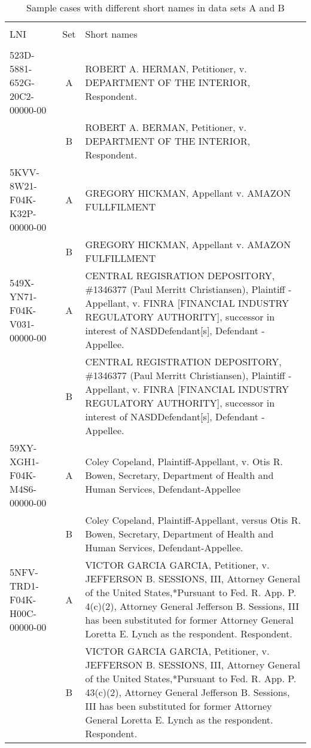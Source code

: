 \documentclass[10pt, letterpaper]{article}
\begin{document}
\begin{spacing}{1.0}
\begin{small}
\begin{longtable}[H]{lcp{4in}}
    \caption{Sample cases with different short names in data sets A and B}\\
    \hline\\[-6pt]
    LNI & Set & Short names\\[4pt]
    \hline\\[-6pt]
    \endhead
    523D-5881-652G-20C2-00000-00 & A & ROBERT A. HERMAN, Petitioner, v. DEPARTMENT OF THE INTERIOR, Respondent.\\[4pt] & B & ROBERT A. BERMAN, Petitioner, v. DEPARTMENT OF THE INTERIOR, Respondent.\\[6pt]
    5KVV-8W21-F04K-K32P-00000-00 & A & GREGORY HICKMAN, Appellant v. AMAZON FULLFILMENT\\[4pt] & B & GREGORY HICKMAN, Appellant v. AMAZON FULFILLMENT\\[6pt]
    549X-YN71-F04K-V031-00000-00 & A & CENTRAL REGISRATION DEPOSITORY, \#1346377 (Paul Merritt Christiansen), Plaintiff - Appellant, v. FINRA [FINANCIAL INDUSTRY REGULATORY AUTHORITY], successor in interest of NASDDefendant[s], Defendant - Appellee.\\[4pt] & B & CENTRAL REGISTRATION DEPOSITORY, \#1346377 (Paul Merritt Christiansen), Plaintiff - Appellant, v. FINRA [FINANCIAL INDUSTRY REGULATORY AUTHORITY], successor in interest of NASDDefendant[s], Defendant - Appellee.\\[6pt]
    59XY-XGH1-F04K-M4S6-00000-00 & A & Coley Copeland, Plaintiff-Appellant, v. Otis R. Bowen, Secretary, Department of Health and Human Services, Defendant-Appellee\\[4pt] & B & Coley Copeland, Plaintiff-Appellant, versus Otis R. Bowen, Secretary, Department of Health and Human Services, Defendant-Appellee.\\[6pt]
    5NFV-TRD1-F04K-H00C-00000-00 & A & VICTOR GARCIA GARCIA, Petitioner, v. JEFFERSON B. SESSIONS, III, Attorney General of the United States,*Pursuant to Fed. R. App. P. 4(c)(2), Attorney General Jefferson B. Sessions, III has been substituted for former Attorney General Loretta E. Lynch as the respondent. Respondent.\\[4pt] & B & VICTOR GARCIA GARCIA, Petitioner, v. JEFFERSON B. SESSIONS, III, Attorney General of the United States,*Pursuant to Fed. R. App. P. 43(c)(2), Attorney General Jefferson B. Sessions, III has been substituted for former Attorney General Loretta E. Lynch as the respondent. Respondent.\\[6pt]

\end{longtable}
\end{small}
\end{spacing}
\end{document}
